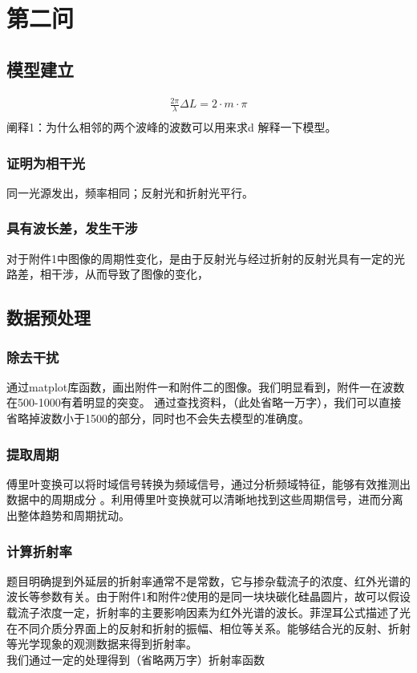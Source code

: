 \documentclass[12pt, a4paper, oneside]{ctexart}
\begin{document}
	\section{第二问}
	\subsection{模型建立}
	\begin{align*}
		\frac{2\pi}{\lambda}\Delta L = 2\cdot m\cdot \pi  \\
	\end{align*}
	阐释1：为什么相邻的两个波峰的波数可以用来求d
	解释一下模型。
	\subsubsection{证明为相干光}
	同一光源发出，频率相同；反射光和折射光平行。
	\subsubsection{具有波长差，发生干涉}
	对于附件1中图像的周期性变化，是由于反射光与经过折射的反射光具有一定的光路差，相干涉，从而导致了图像的变化，
	\subsection{数据预处理}
	\subsubsection{除去干扰}
	通过matplot库函数，画出附件一和附件二的图像。我们明显看到，附件一在波数在500-1000有着明显的突变。
	通过查找资料，（此处省略一万字），我们可以直接省略掉波数小于1500的部分，同时也不会失去模型的准确度。
	\subsubsection{提取周期}
	傅里叶变换可以将时域信号转换为频域信号，通过分析频域特征，能够有效推测出数据中的周期成分 。利用傅里叶变换就可以清晰地找到这些周期信号，进而分离出整体趋势和周期扰动。
	\subsubsection{计算折射率}
	题目明确提到外延层的折射率通常不是常数，它与掺杂载流子的浓度、红外光谱的波长等参数有关。由于附件1和附件2使用的是同一块块碳化硅晶圆片，故可以假设载流子浓度一定，折射率的主要影响因素为红外光谱的波长。菲涅耳公式描述了光在不同介质分界面上的反射和折射的振幅、相位等关系。能够结合光的反射、折射等光学现象的观测数据来得到折射率。\\
	我们通过一定的处理得到（省略两万字）折射率函数
\end{document}
